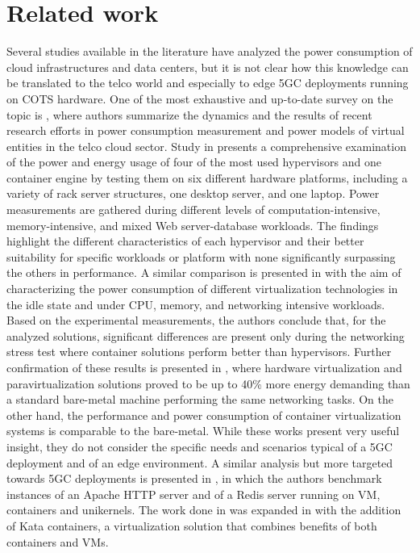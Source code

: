 \section{Related work}
\label{sec:Related_work}

Several studies available in the literature have analyzed the power consumption of cloud infrastructures and data centers, but it is not clear how this knowledge can be translated to the telco world and especially to edge 5GC deployments running on COTS hardware.
One of the most exhaustive and up-to-date survey on the topic is \cite{Depasquale2023}, where authors summarize the dynamics and the results of recent research efforts in power consumption measurement and power models of virtual entities in the telco cloud sector.
Study in \cite{Jiang2019} presents a comprehensive examination of the power and energy usage of four of the most used hypervisors and one container engine by testing them on six different hardware platforms, including a variety of rack server structures, one desktop server, and one laptop. Power measurements are gathered during different levels of computation-intensive, memory-intensive, and mixed Web server-database workloads. The findings highlight the different characteristics of each hypervisor and their better suitability for specific workloads or platform with none significantly surpassing the others in performance.
A similar comparison is presented in \cite{Morabito2015} with the aim of characterizing the power consumption of different virtualization technologies in the idle state and under CPU, memory, and networking intensive workloads.
Based on the experimental measurements, the authors conclude that, for the analyzed solutions, significant differences are present only during the networking stress test where container solutions perform better than hypervisors.
Further confirmation of these results is presented in \cite{Shea2014}, where hardware virtualization and paravirtualization solutions proved to be up to 40\% more energy demanding than a standard bare-metal machine performing the same networking tasks. On the other hand, the performance and power consumption of container
virtualization systems is comparable to the bare-metal.
While these works present very useful insight, they do not consider the specific needs and scenarios typical of a 5GC deployment and of an edge environment.
A similar analysis but more targeted towards 5GC deployments is presented in \cite{Behravesh2019}, in which the authors benchmark instances of an Apache HTTP server and of a Redis server running on VM, containers and unikernels. The work done in \cite{Behravesh2019} was expanded in \cite{Aggarwal2020} with the addition of Kata containers, a virtualization solution that combines benefits of both containers and VMs.
